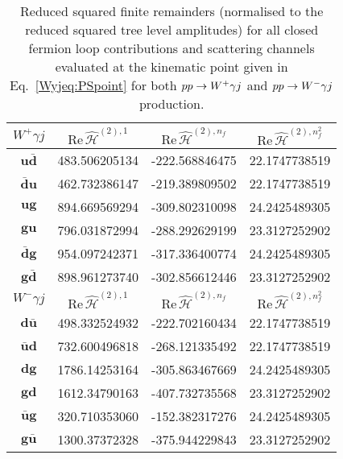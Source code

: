 \documentclass[main.tex]{subfiles}
\begin{document}
\begin{table}[t!]
\centering
\begin{tabularx}{1.0\textwidth}{|C{0.4}|C{1.2}|C{1.2}|C{1.2}|}
\hline
$W^+ \gamma j $ & $\mathrm{Re}\,\hat{\mathcal{H}}^{(2),1}$ & $\mathrm{Re}\,\hat{\mathcal{H}}^{(2),n_f}$ & $\mathrm{Re}\,\hat{\mathcal{H}}^{(2),n_f^2}$ \\
\hline
$\mathbf{u\bar{d}}$  & 483.506205134 & -222.568846475 & 22.1747738519  \\
$\mathbf{\bar{d}u}$  & 462.732386147 & -219.389809502 & 22.1747738519  \\
$\mathbf{ug}      $  & 894.669569294 & -309.802310098 & 24.2425489305  \\
$\mathbf{gu}      $  & 796.031872994 & -288.292629199 & 23.3127252902  \\
$\mathbf{\bar{d}g}$  & 954.097242371 & -317.336400774 & 24.2425489305  \\
$\mathbf{g\bar{d}}$  & 898.961273740 & -302.856612446 & 23.3127252902  \\
\hline
\hline
$W^- \gamma j $ & $\mathrm{Re}\,\hat{\mathcal{H}}^{(2),1}$ & $\mathrm{Re}\,\hat{\mathcal{H}}^{(2),n_f}$ & $\mathrm{Re}\,\hat{\mathcal{H}}^{(2),n_f^2}$ \\
\hline
$\mathbf{d\bar{u}}$  & 498.332524932 & -222.702160434 & 22.1747738519  \\ 
$\mathbf{\bar{u}d}$  & 732.600496818 & -268.121335492 & 22.1747738519  \\
$\mathbf{dg}      $  & 1786.14253164 & -305.863467669 & 24.2425489305  \\
$\mathbf{gd}      $  & 1612.34790163 & -407.732735568 & 23.3127252902  \\
$\mathbf{\bar{u}g}$  & 320.710353060 & -152.382317276 & 24.2425489305  \\
$\mathbf{g\bar{u}}$  & 1300.37372328 & -375.944229843 & 23.3127252902  \\
\hline
\end{tabularx}
\caption{\label{Wyjtab:benchmarkfinremsq2L} 
Reduced squared finite remainders (normalised to the reduced squared tree level amplitudes) for all closed fermion loop contributions and scattering channels
evaluated at the kinematic point given in Eq.~\eqref{Wyjeq:PSpoint} for both $pp\to W^+\gamma j$ and $pp\to W^-\gamma j$ production.
}
\end{table}
\end{document}
